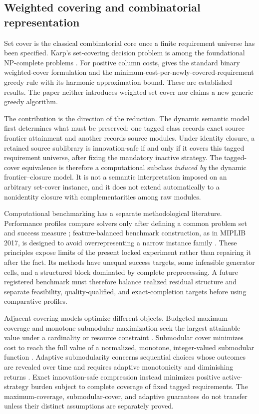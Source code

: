 \subsection{Weighted covering and combinatorial representation}

Set cover is the classical combinatorial core once a finite requirement
universe has been specified. Karp's set-covering decision problem is among the
foundational NP-complete problems \citep{Karp1972}. For positive column costs,
\citet{Chvatal1979} gives the standard binary weighted-cover formulation and
the minimum-cost-per-newly-covered-requirement greedy rule with its harmonic
approximation bound. These are established results. The paper neither
introduces weighted set cover nor claims a new generic greedy algorithm.

The contribution is the direction of the reduction. The dynamic semantic model
first determines what must be preserved: one tagged class records exact source
frontier attainment and another records source modules. Under identity closure,
a retained source sublibrary is innovation-safe if and only if it covers this
tagged requirement universe, after fixing the mandatory inactive strategy.
The tagged-cover equivalence is therefore a computational subclass
\emph{induced by} the dynamic frontier--closure model. It is not a semantic
interpretation imposed on an arbitrary set-cover instance, and it does not
extend automatically to a nonidentity closure with complementarities among
raw modules.

Computational benchmarking has a separate methodological literature.
Performance profiles compare solvers only after defining a common problem set
and success measure \citep{DolanMore2002}; feature-balanced benchmark
construction, as in MIPLIB 2017, is designed to avoid overrepresenting a narrow
instance family \citep{GleixnerEtAl2021}. These principles expose limits of the
present locked experiment rather than repairing it after the fact. Its methods
have unequal success targets, some infeasible generator cells, and a structured
block dominated by complete preprocessing. A future registered benchmark must
therefore balance realized residual structure and separate feasibility,
quality-qualified, and exact-completion targets before using comparative
profiles.

Adjacent covering models optimize different objects. Budgeted maximum coverage
and monotone submodular maximization seek the largest attainable value under a
cardinality or resource constraint \citep{NemhauserWolseyFisher1978}.
Submodular cover minimizes cost to reach the full value of a normalized,
monotone, integer-valued submodular function \citep{Wolsey1982}. Adaptive
submodularity concerns sequential choices whose outcomes are revealed over
time and requires adaptive monotonicity and diminishing returns
\citep{GolovinKrause2011}. Exact innovation-safe compression instead minimizes
positive active-strategy burden subject to complete coverage of fixed tagged
requirements. The maximum-coverage, submodular-cover, and adaptive guarantees
do not transfer unless their distinct assumptions are separately proved.

